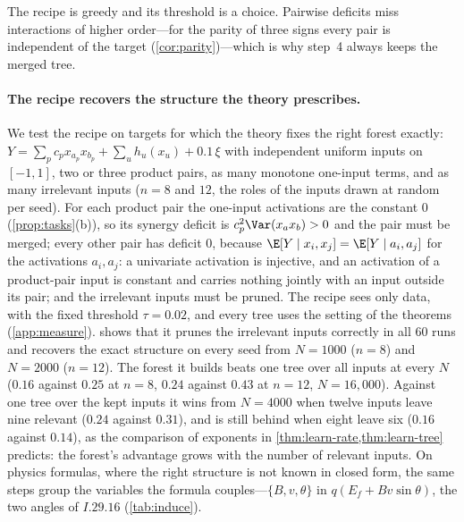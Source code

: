 The recipe is greedy and its threshold is a choice.  Pairwise deficits miss interactions of
higher order---for the parity of three signs every pair is independent of the target
(\cref{cor:parity})---which is why step~4 always keeps the merged tree.  

\paragraph{The recipe recovers the structure the theory prescribes.}
We test the recipe on targets for which the theory fixes the right forest exactly:
$Y=\sum_pc_px_{a_p}x_{b_p}+\sum_uh_u(x_u)+0.1\,\xi$ with independent uniform inputs on $[-1,1]$, two or
three product pairs, as many monotone one-input terms, and as many irrelevant inputs ($n=8$
and $12$, the roles of the inputs drawn at random per seed).  For each product pair the
one-input activations are the constant $0$ (\cref{prop:tasks}(b)), so its synergy deficit is
$c_p^2\Var(x_ax_b)>0$ and the pair must be merged; every other pair has deficit $0$, because
$\E[Y\mid x_i,x_j]=\E[Y\mid a_i,a_j]$ for the activations $a_i,a_j$: a univariate activation is
injective, and an activation of a product-pair input is constant and carries nothing jointly
with an input outside its pair; and the irrelevant inputs
must be pruned.  The recipe sees only data, with the fixed threshold $\tau=0.02$, and every tree
uses the setting of the theorems (\cref{app:measure}).   shows that it prunes the
irrelevant inputs correctly in all $60$ runs and recovers the exact structure on every seed
from $N=1000$ ($n=8$) and $N=2000$ ($n=12$).  The forest it builds beats one tree over all
inputs at every $N$ ($0.16$ against $0.25$ at $n=8$, $0.24$ against $0.43$ at $n=12$, $N=16{,}000$).
Against one tree over the kept inputs it wins from $N=4000$ when twelve inputs leave nine
relevant ($0.24$ against $0.31$), and is still behind when eight leave six ($0.16$ against $0.14$),
as the comparison of exponents in \cref{thm:learn-rate,thm:learn-tree} predicts: the forest's
advantage grows with the number of relevant inputs.  On physics formulas, where the right
structure is not known in closed form, the same steps group the variables the formula
couples---$\{B,v,\theta\}$ in $q(E_f+Bv\sin\theta)$, the two angles of $I.29.16$
(\cref{tab:induce}).

\begin{table}[t]
\centering\small
{}
\caption{The recipe on targets with a known right structure (five seeds per row).
``recovered'': runs in which the merged groups and the pruned inputs are exactly the
prescribed ones; ``pruned'': runs with exactly the irrelevant inputs pruned.  Test
RMSE$/\mathrm{sd}(f)$ of one tree over all inputs, one tree over the kept inputs, and the
recipe's forest.}
\label{tab:recipe}
\end{table}

